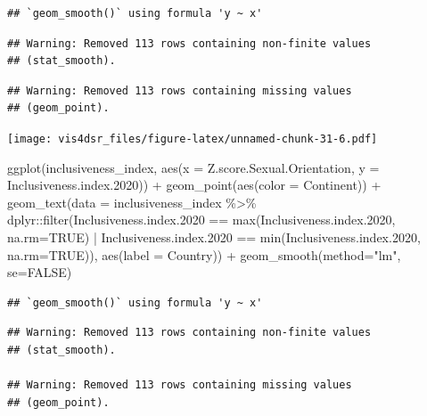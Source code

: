 \documentclass[
]{krantz}
\makeatletter
\newenvironment{Shaded}{\begin{snugshade}}{\end{snugshade}}
\newcommand{\AttributeTok}[1]{\textcolor[rgb]{0.61,0.61,0.61}{#1}}
\newcommand{\ConstantTok}[1]{\textcolor[rgb]{0,0,0}{#1}}
\newcommand{\FloatTok}[1]{\textcolor[rgb]{0.06,0.06,0.06}{#1}}
\newcommand{\FunctionTok}[1]{\textcolor[rgb]{0,0,0}{#1}}
\newcommand{\NormalTok}[1]{#1}
\newcommand{\SpecialCharTok}[1]{\textcolor[rgb]{0,0,0}{#1}}
\newcommand{\StringTok}[1]{\textcolor[rgb]{0.5,0.5,0.5}{#1}}
\newenvironment{kframe}{%
\medskip{}
\setlength{\fboxsep}{.8em}
 \def\at@end@of@kframe{}%
 \ifinner\ifhmode%
  \def\at@end@of@kframe{\end{minipage}}%
  \begin{minipage}{\columnwidth}%
 \fi\fi%
 \def\FrameCommand##1{\hskip\@totalleftmargin \hskip-\fboxsep
 \colorbox{shadecolor}{##1}\hskip-\fboxsep
     \hskip-\linewidth \hskip-\@totalleftmargin \hskip\columnwidth}%
 \MakeFramed {\advance\hsize-\width
   \@totalleftmargin\z@ \linewidth\hsize
   \@setminipage}}%
 {\par\unskip\endMakeFramed%
 \at@end@of@kframe}
\renewenvironment{Shaded}{\begin{kframe}}{\end{kframe}}
\makeatother
\begin{document}
\begin{verbatim}
## `geom_smooth()` using formula 'y ~ x'
\end{verbatim}

\begin{verbatim}
## Warning: Removed 113 rows containing non-finite values
## (stat_smooth).
\end{verbatim}

\begin{verbatim}
## Warning: Removed 113 rows containing missing values
## (geom_point).
\end{verbatim}

\texttt{[image: vis4dsr\_files/figure-latex/unnamed-chunk-31-6.pdf]}

\begin{Shaded}
\begin{Highlighting}[]
\FunctionTok{ggplot}\NormalTok{(inclusiveness\_index, }
       \FunctionTok{aes}\NormalTok{(}\AttributeTok{x =}\NormalTok{ Z.score.Sexual.Orientation, }
           \AttributeTok{y =}\NormalTok{ Inclusiveness.index}\FloatTok{.2020}\NormalTok{)) }\SpecialCharTok{+}
  \FunctionTok{geom\_point}\NormalTok{(}\FunctionTok{aes}\NormalTok{(}\AttributeTok{color =}\NormalTok{ Continent)) }\SpecialCharTok{+}
  \FunctionTok{geom\_text}\NormalTok{(}\AttributeTok{data =}\NormalTok{ inclusiveness\_index }\SpecialCharTok{\%\textgreater{}\%} 
\NormalTok{              dplyr}\SpecialCharTok{::}\FunctionTok{filter}\NormalTok{(Inclusiveness.index}\FloatTok{.2020} \SpecialCharTok{==} \FunctionTok{max}\NormalTok{(Inclusiveness.index}\FloatTok{.2020}\NormalTok{, }\AttributeTok{na.rm=}\ConstantTok{TRUE}\NormalTok{) }\SpecialCharTok{|}\NormalTok{ Inclusiveness.index}\FloatTok{.2020} \SpecialCharTok{==} \FunctionTok{min}\NormalTok{(Inclusiveness.index}\FloatTok{.2020}\NormalTok{, }\AttributeTok{na.rm=}\ConstantTok{TRUE}\NormalTok{)), }\FunctionTok{aes}\NormalTok{(}\AttributeTok{label =}\NormalTok{ Country)) }\SpecialCharTok{+}
  \FunctionTok{geom\_smooth}\NormalTok{(}\AttributeTok{method=}\StringTok{"lm"}\NormalTok{, }\AttributeTok{se=}\ConstantTok{FALSE}\NormalTok{)}
\end{Highlighting}
\end{Shaded}

\begin{verbatim}
## `geom_smooth()` using formula 'y ~ x'
\end{verbatim}

\begin{verbatim}
## Warning: Removed 113 rows containing non-finite values
## (stat_smooth).

## Warning: Removed 113 rows containing missing values
## (geom_point).
\end{verbatim}
\end{document}
